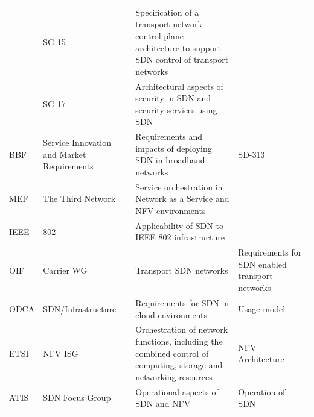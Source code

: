 {{\begin{table}[!htp]
\begin{center}
\begin{tabularx}{\linewidth}{p{0.8cm}p{3.8cm}Xp{4.6cm}}
& SG 15 & Specification of a transport network control plane architecture to support SDN control of transport networks & \\\cline{2-4}

& SG 17 & Architectural aspects of security in SDN and security services using SDN & \\
\hline
BBF & Service Innovation and Market Requirements & Requirements and impacts of deploying SDN in broadband networks & SD-313~\cite{bforum2014}\\
\hline
MEF & The Third Network & Service orchestration in Network as a Service and NFV environments & \\
\hline
IEEE & 802 & Applicability of SDN to IEEE 802 infrastructure & \\
\hline
OIF & Carrier WG & Transport SDN networks & Requirements for SDN enabled transport networks~\cite{oif2013}\\
\hline
ODCA & SDN/Infrastructure  & Requirements for SDN in cloud environments & Usage model~\cite{odc2014}\\
\hline
ETSI & NFV ISG & Orchestration of network functions, including the combined control of computing, storage and networking resources & NFV Architecture~\cite{etsi2013}\\
\hline
ATIS & SDN Focus Group & Operational aspects of SDN and NFV & Operation of SDN~\cite{atis2014}\\
\hline
\end{tabularx}
\end{center}
\end{table}
}



} %
